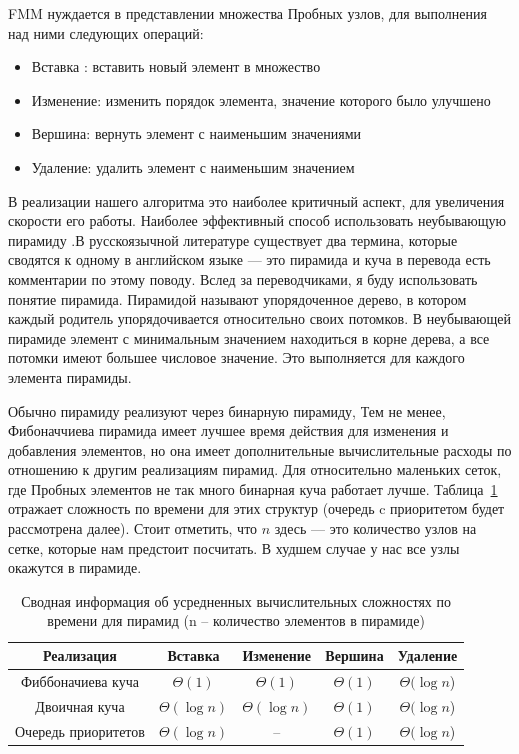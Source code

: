 FMM нуждается в представлении множества Пробных узлов, для
выполнения над ними следующих операций:
\begin{itemize}
\item Вставка : вставить новый элемент в множество
\item Изменение: изменить порядок элемента, значение которого было
  улучшено
\item Вершина: вернуть элемент с наименьшим значениями
\item Удаление: удалить элемент с наименьшим значением 
\end{itemize}
В реализации нашего алгоритма это наиболее критичный аспект, для
увеличения скорости его работы. Наиболее эффективный способ
использовать неубывающую пирамиду \cite{K2017}.В русскоязычной
литературе существует два термина, которые сводятся к одному в
английском языке --- это пирамида и куча в перевода \cite{K2017} есть
комментарии по этому поводу. Вслед за переводчиками, я буду
использовать понятие пирамида. Пирамидой называют упорядоченное дерево,
в котором каждый родитель упорядочивается относительно своих потомков. В
неубывающей пирамиде элемент с минимальным значением находиться в
корне дерева, а все потомки имеют большее числовое значение. Это
выполняется для каждого элемента пирамиды.

Обычно пирамиду реализуют через бинарную пирамиду, Тем не менее,
Фибоначчиева пирамида \cite{F1987} имеет лучшее время действия для
изменения и добавления элементов, но она имеет дополнительные
вычислительные расходы по отношению к другим реализациям пирамид. Для
относительно маленьких сеток, где Пробных элементов не так много
бинарная куча работает лучше. Таблица~\ref{tab:perf} отражает
сложность по времени для этих структур (очередь c приоритетом будет
рассмотрена далее). Стоит отметить, что $n$ здесь --- это количество
узлов на сетке, которые нам предстоит посчитать. В худшем случае у нас
все узлы окажутся в пирамиде.

\begin{table}
  \centering
  \caption{Сводная информация об усредненных вычислительных
    сложностях по времени для пирамид (n -- количество элементов в
    пирамиде)}
  \label{tab:perf}
  \begin{tabular}{|*{5}{c|}}
    \hline
Реализация & Вставка & Изменение & Вершина & Удаление\\[0.3cm]\hline
Фиббоначиева куча & $\Theta(1)$ & $\Theta(1)$&$\Theta(1)$&$\Theta(\log n$) \\\hline
Двоичная куча & $\Theta(\log n)$ & $\Theta(\log n)$&$\Theta(1)$&$\Theta(\log n$) \\\hline
Очередь приоритетов & $\Theta(\log n)$ & -- &$\Theta(1)$&$\Theta(\log n$) \\\hline
    
  \end{tabular}
\end{table}


